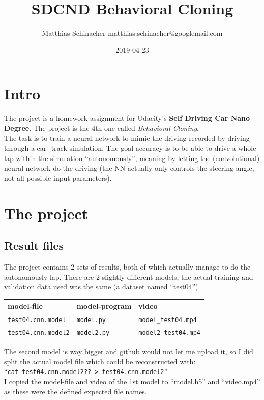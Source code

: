 \documentclass[a4paper]{article}
\title{SDCND Behavioral Cloning}
\date{2019-04-23}
\author{Matthias Schinacher matthias.schinacher@googlemail.com}
\begin{document}
\maketitle
\tableofcontents
\newpage

\section{Intro}
The project is a homework assignment for Udacity's \textbf{Self Driving Car Nano Degree}.
The project is the 4th one called \textit{Behavioral Cloning}.
\\
The task is to train a neural network to mimic the driving recorded
by driving through a car- track simulation.
The goal accuracy is to be able to drive a whole lap within the simulation
\enquote{autonomously}, meaning by letting the (convolutional) neural network
do the driving (the NN actually only controls the steering angle, not all possible
input parameters).

\section{The project}
\subsection{Result files}
The project contains 2 sets of results, both of which actually manage to
do the autonomously lap. There are 2 slightly different models, the actual
training and validation data used was the same (a dataset named \enquote{test04}).

\begin{tabular}{ |l|l|l| }
  \hline
  model-file & model-program & video \\
  \hline
  \texttt{test04.cnn.model} & \texttt{model.py} & \texttt{model\_test04.mp4} \\
  \texttt{test04.cnn.model2} & \texttt{model2.py} & \texttt{model2\_test04.mp4} \\
  \hline
\end{tabular}

The second model is way bigger and github would not let me upload it, so I did split
the actual model file which could be reconstructed with:\\
\enquote{\texttt{cat test04.cnn.model2?? > test04.cnn.model2}}
\\
I copied the model-file and video of the 1st model to \enquote{model.h5} and
\enquote{video.mp4} as these were the defined expected file names.
\end{document}
